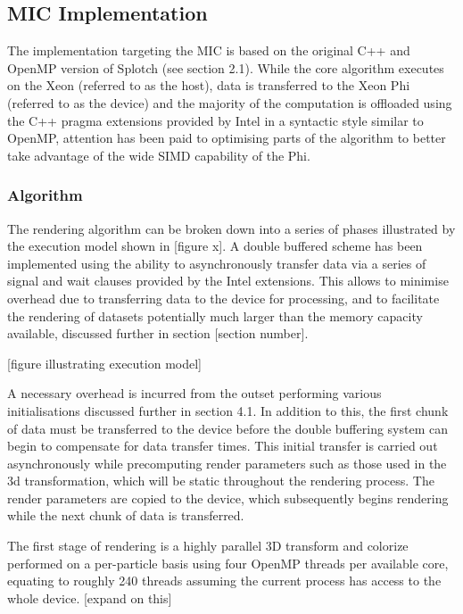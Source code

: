 \documentclass{easychair}
\begin{document}
\subsection{MIC Implementation}
\label{sect:micimplementation}

The implementation targeting the MIC is based on the original C++ and OpenMP version of Splotch (see section 2.1). 
While the core algorithm executes on the Xeon (referred to as the host), data is transferred to the Xeon Phi (referred 
to as the device) and the majority of the computation is offloaded using the C++ pragma extensions provided by Intel 
in a syntactic style similar to OpenMP, attention has been paid to optimising parts of the algorithm to better take 
advantage of the wide SIMD capability of the Phi.


\subsubsection{Algorithm}
\label{sect:micalgorithm}

The rendering algorithm can be broken down into a series of phases illustrated by the execution model shown in [figure x]. 
A double buffered scheme has been implemented using the ability to asynchronously transfer data via a series of signal 
and wait clauses provided by the Intel extensions. This allows to minimise overhead due to transferring data to the device 
for processing, and to facilitate the rendering of datasets potentially much larger than the memory capacity available, 
discussed further in section [section number].

\medskip
\centerline{[figure illustrating execution model]}
\medskip
A necessary overhead is incurred from the outset performing various initialisations discussed further in section 4.1. In 
addition to this, the first chunk of data must be transferred to the device before the double buffering system can begin 
to compensate for data transfer times. This initial transfer is carried out asynchronously while precomputing render 
parameters such as those used in the 3d transformation, which will be static throughout the rendering process. The render 
parameters are copied to the device, which subsequently begins rendering while the next chunk of data is transferred.

The first stage of rendering is a highly parallel 3D transform and colorize performed on a per-particle basis using 
four OpenMP threads per available core, equating to roughly 240 threads assuming the current process has access to the 
whole device. [expand on this]
\end{document}

